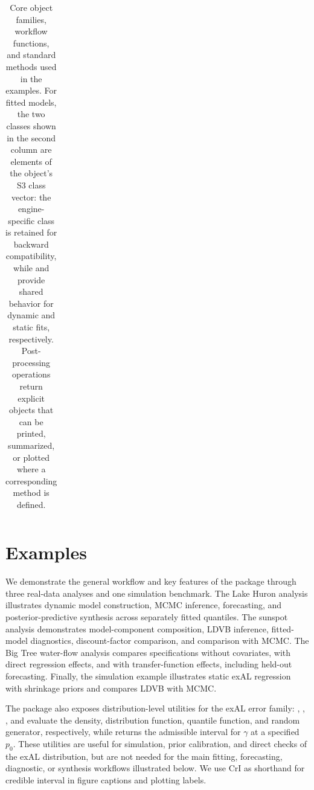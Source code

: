 \documentclass{jss}
\begin{document}
\begin{table}[!htbp]
\begin{tabularx}{\textwidth}{
  @{}
  >{\raggedright\arraybackslash}p{}
  >{\raggedright\arraybackslash}p{}
  >{\raggedright\arraybackslash}X
  @{}
}
\bottomrule
\end{tabularx}

\caption{
Core object families, workflow functions, and standard methods used in
the examples. For fitted models, the two classes shown in the second
column are elements of the object's S3 class vector: the engine-specific
class is retained for backward compatibility, while  and
 provide shared behavior for dynamic and static fits,
respectively. Post-processing operations return explicit objects that can
be printed, summarized, or plotted where a corresponding method is defined.
}
\label{table:flow}
\end{table}



\section{Examples}
 \label{sec:exs}


We demonstrate the general workflow and key features of the package through three real-data analyses and one simulation benchmark. The Lake Huron analysis illustrates dynamic model construction, MCMC inference, forecasting, and posterior-predictive synthesis across separately fitted quantiles. The sunspot analysis demonstrates model-component composition, LDVB inference, fitted-model diagnostics, discount-factor comparison, and comparison with MCMC. The Big Tree water-flow analysis compares specifications without covariates, with direct regression effects, and with transfer-function effects, including held-out forecasting. Finally, the simulation example illustrates static exAL regression with shrinkage priors and compares LDVB with MCMC.

The package also exposes distribution-level utilities for the exAL error family: , , , and  evaluate the density, distribution function, quantile function, and random generator, respectively, while   returns the admissible interval for $\gamma$ at a specified \(p_0\). These utilities are useful for simulation, prior calibration, and direct checks of the exAL distribution, but are not needed for the main fitting, forecasting, diagnostic, or synthesis workflows illustrated below. We use CrI as shorthand for credible interval in figure captions and plotting labels.
\end{document}
